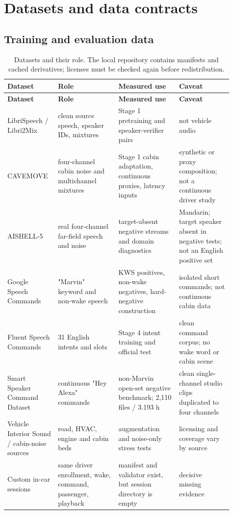 \documentclass[11pt,a4paper]{article}
\begin{document}
\section{Datasets and data contracts}

\subsection{Training and evaluation data}

\begin{longtable}{@{}p{0.19\linewidth}p{0.25\linewidth}p{0.25\linewidth}p{0.22\linewidth}@{}}
\caption{Datasets and their role. The local repository contains manifests and
cached derivatives; licenses must be checked again before redistribution.}
\label{tab:datasets}\\
\toprule
\textbf{Dataset} & \textbf{Role} & \textbf{Measured use} & \textbf{Caveat}\\
\midrule
\endfirsthead
\toprule
\textbf{Dataset} & \textbf{Role} & \textbf{Measured use} & \textbf{Caveat}\\
\midrule
\endhead
LibriSpeech / Libri2Mix & clean source speech, speaker IDs, mixtures & Stage 1 pretraining and speaker-verifier pairs & not vehicle audio\\
CAVEMOVE & four-channel cabin noise and multichannel mixtures & Stage 1 cabin adaptation, continuous proxies, latency inputs & synthetic or proxy composition; not a continuous driver study\\
AISHELL-5 & real four-channel far-field speech and noise & target-absent negative streams and domain diagnostics & Mandarin; target speaker absent in negative tests; not an English positive set\\
Google Speech Commands & "Marvin" keyword and non-wake speech & KWS positives, non-wake negatives, hard-negative construction & isolated short commands; not continuous cabin data\\
Fluent Speech Commands & 31 English intents and slots & Stage 4 intent training and official test & clean command corpus; no wake word or cabin scene\\
Smart Speaker Command Dataset & continuous "Hey Alexa" commands & non-Marvin open-set negative benchmark; 2,110 files / 3.193 h & clean single-channel studio clips duplicated to four channels\\
Vehicle Interior Sound / cabin-noise sources & road, HVAC, engine and cabin beds & augmentation and noise-only stress tests & licensing and coverage vary by source\\
Custom in-car sessions & same driver enrollment, wake, command, passenger, playback & manifest and validator exist, but session directory is empty & decisive missing evidence\\
\bottomrule
\end{longtable}
\end{document}
